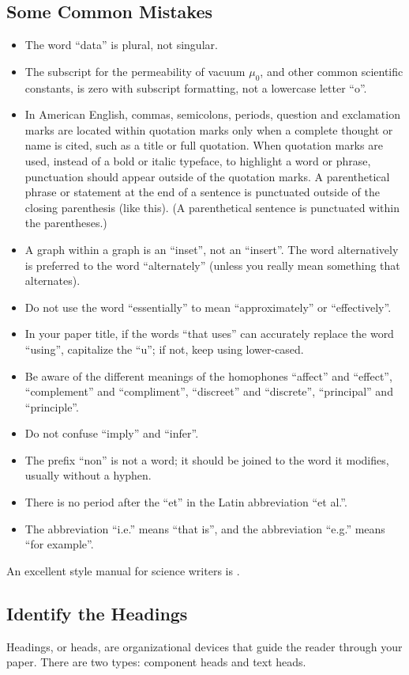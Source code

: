 \documentclass[conference]{IEEEtran}
\begin{document}
\subsection{Some Common Mistakes}\label{SCM}
\begin{itemize}
\item The word ``data'' is plural, not singular.
\item The subscript for the permeability of vacuum $\mu_{0}$, and other common scientific constants, is zero with subscript formatting, not a lowercase letter ``o''.
\item In American English, commas, semicolons, periods, question and exclamation marks are located within quotation marks only when a complete thought or name is cited, such as a title or full quotation. When quotation marks are used, instead of a bold or italic typeface, to highlight a word or phrase, punctuation should appear outside of the quotation marks. A parenthetical phrase or statement at the end of a sentence is punctuated outside of the closing parenthesis (like this). (A parenthetical sentence is punctuated within the parentheses.)
\item A graph within a graph is an ``inset'', not an ``insert''. The word alternatively is preferred to the word ``alternately'' (unless you really mean something that alternates).
\item Do not use the word ``essentially'' to mean ``approximately'' or ``effectively''.
\item In your paper title, if the words ``that uses'' can accurately replace the word ``using'', capitalize the ``u''; if not, keep using lower-cased.
\item Be aware of the different meanings of the homophones ``affect'' and ``effect'', ``complement'' and ``compliment'', ``discreet'' and ``discrete'', ``principal'' and ``principle''.
\item Do not confuse ``imply'' and ``infer''.
\item The prefix ``non'' is not a word; it should be joined to the word it modifies, usually without a hyphen.
\item There is no period after the ``et'' in the Latin abbreviation ``et al.''.
\item The abbreviation ``i.e.'' means ``that is'', and the abbreviation ``e.g.'' means ``for example''.
\end{itemize}
An excellent style manual for science writers is \cite{techbook}.

\subsection{Identify the Headings}
Headings, or heads, are organizational devices that guide the reader through 
your paper. There are two types: component heads and text heads.
\end{document}
